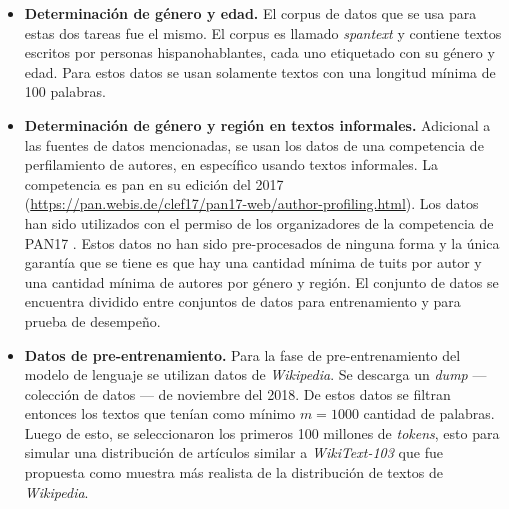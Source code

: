 \begin{itemize}

\item \textbf{Determinación de género y edad.} El corpus de datos que se usa para estas dos tareas fue el mismo. El corpus es llamado \textit{\gls{spantext}} \parencite{villegas:2014:CACIC} y contiene textos escritos por personas hispanohablantes, cada uno etiquetado con su género y edad. Para estos datos se usan solamente textos con una longitud mínima de 100 palabras.

\item \textbf{Determinación de género y región en textos informales.} Adicional a las fuentes de datos mencionadas, se usan los datos de una competencia de perfilamiento de autores, en específico usando textos informales. La competencia es \gls{pan} en su edición del 2017 (\url{https://pan.webis.de/clef17/pan17-web/author-profiling.html}). Los datos han sido utilizados con el permiso de los organizadores de la competencia de PAN17 \parencite{rangel2017proceedings}. Estos datos no han sido pre-procesados de ninguna forma y la única garantía que se tiene es que hay una cantidad mínima de tuits por autor y una cantidad mínima de autores por género y región. El conjunto de datos se encuentra dividido entre conjuntos de datos para entrenamiento y para prueba de desempeño.

\item \textbf{Datos de pre-entrenamiento.} Para la fase de pre-entrenamiento del modelo de lenguaje se utilizan datos de \textit{Wikipedia}. Se descarga un \textit{dump} --- colección de datos --- de noviembre del 2018. De estos datos se filtran entonces los textos que tenían como mínimo $m = 1000$ cantidad de palabras. Luego de esto, se seleccionaron los primeros 100 millones de \textit{tokens}, esto para simular una distribución de artículos similar a \textit{WikiText-103} \parencite{merity2016pointer} que fue propuesta como muestra más realista de la distribución de textos de \textit{Wikipedia}.
\end{itemize}
